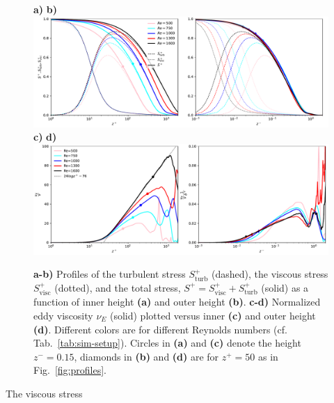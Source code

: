\documentclass[smallcondensed,final]{svjour3}
\begin{document}
\begin{figure}
  \textbf{a)}\hspace{0.47\textwidth} \textbf{b)}\\
  \includegraphics[width=\textwidth]{../plot/stresses.pdf}
  \textbf{c)}\hspace{0.47\textwidth} \textbf{d)}\\    
  \includegraphics[width=\textwidth]{../plot/eddy_viscosity.pdf}\\
  \caption{
    \textbf{a-b)} Profiles of
    the turbulent stress $S_\mathrm{turb}^+$ (dashed), 
    the viscous stress  $S_\mathrm{visc}^+$ (dotted), 
    and the total stress, $S^+=S_\mathrm{visc}^++S_\mathrm{turb}^+$ (solid)
    as a function of inner height \textbf{(a)} and outer height \textbf{(b)}. 
    \textbf{c-d)} Normalized eddy viscosity $\nu_E$ (solid) plotted versus
    inner \textbf{(c)} and outer height \textbf{(d)}.
    Different colors are for different Reynolds numbers (cf. Tab.~\ref{tab:sim-setup}).
    Circles in \textbf{(a)} and \textbf{(c)} denote the height
    $z^-=0.15$, diamonds in \textbf{(b)} and \textbf{(d)} are for $z^+=50$
    as in Fig.~\ref{fig:profiles}.
    \label{fig:stresses}}  
\end{figure} 
The viscous stress
%
\end{document}
